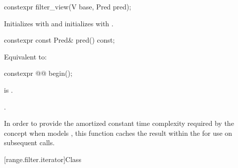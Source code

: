 %
\begin{itemdecl}
constexpr filter_view(V base, Pred pred);
\end{itemdecl}

\begin{itemdescr}
\pnum
\effects
Initializes  with  and initializes
 with .
\end{itemdescr}

%
\begin{itemdecl}
constexpr const Pred& pred() const;
\end{itemdecl}

\begin{itemdescr}
\pnum
\effects
Equivalent to: 
\end{itemdescr}

%
\begin{itemdecl}
constexpr @@ begin();
\end{itemdecl}

\begin{itemdescr}
\pnum
\expects
{} is .

\pnum
\returns
{}.

\pnum
\remarks
In order to provide the amortized constant time complexity required by
the  concept
when  models ,
this function caches the result within the
 for use on subsequent calls.
\end{itemdescr}

[range.filter.iterator]{Class }

